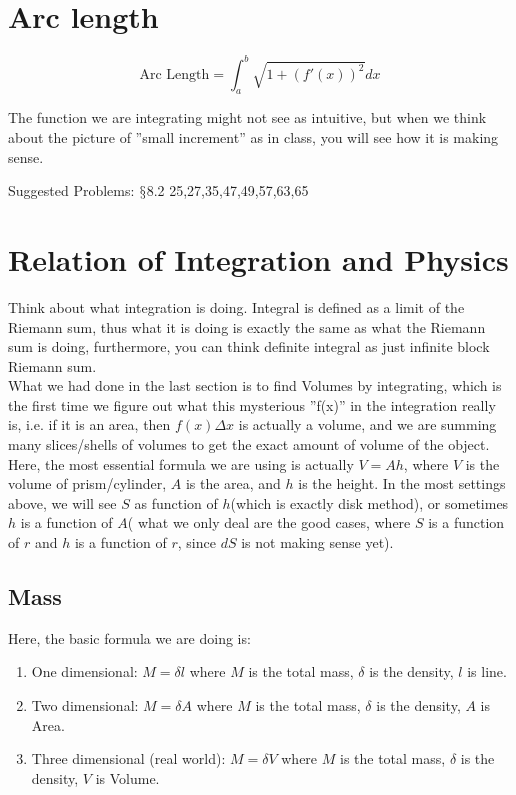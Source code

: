 \documentclass[12pt]{article}
\theoremstyle{definition}
\theoremstyle{definition}
\theoremstyle{remark}
\theoremstyle{definition}
\theoremstyle{definition}
\theoremstyle{definition}
\begin{document}
\section{Arc length}

\[\text{Arc Length}=\int^b_a\sqrt{1+(f'(x))^2}dx\]

The function we are integrating might not see as intuitive, but when we think about the picture of ''small increment'' as in class, you will see how it is making sense.

Suggested Problems: $\mathsection$8.2 25,27,35,47,49,57,63,65


\section{Relation of Integration and Physics}

Think about what integration is doing. Integral is defined as a limit of the Riemann sum, thus what it is doing is exactly the same as what the Riemann sum is doing, furthermore, you can think definite integral as just infinite block Riemann sum.\\
What we had done in the last section is to find Volumes by integrating, which is the first time we figure out what this mysterious ''f(x)'' in the integration really is, i.e. if it is an area, then $f(x)\Delta x$ is actually a volume, and we are summing many slices/shells of volumes to get the exact amount of volume of the object.\\
Here, the most essential formula we are using is actually $V=Ah$, where $V$ is the volume of prism/cylinder, $A$ is the area, and $h$ is the height. In the most settings above, we will see $S$ as function of $h$(which is exactly disk method), or sometimes $h$ is a function of $A$( what we only deal are the good cases, where $S$ is a function of $r$ and $h$ is a function of  $r$, since $dS$ is not making sense yet).

\subsection{Mass}


Here, the basic formula we are doing is:\begin{enumerate}
\item One dimensional: $M=\delta l$ where $M$ is the total mass, $\delta$ is the density, $l$ is line.
\item
Two dimensional: $M=\delta A$ where $M$ is the total mass, $\delta$ is the density, $A$ is Area.
\item Three dimensional (real world): $M=\delta V$ where $M$ is the total mass, $\delta$ is the density, $V$ is Volume.
\end{enumerate}
\end{document}
